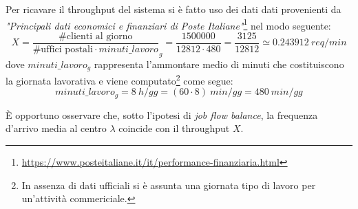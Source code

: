 Per ricavare il throughput del sistema si è fatto uso dei dati dati provenienti da \textsl{"Principali dati economici e finanziari di Poste Italiane"}\footnote{\url{https://www.posteitaliane.it/it/performance-finanziaria.html}} nel modo seguente:
\begin{equation}
X = \frac{\# \text{clienti al giorno}}{\#\text{uffici postali} \cdot minuti\_lavoro}_{g} = \frac{1500000}{12812\cdot 480} = \frac{3125}{12812} \simeq 0.243912\ req/min
\end{equation} 
dove $minuti\_lavoro_{g}$ rappresenta l'ammontare medio di minuti che costituiscono la giornata lavorativa e viene computato\footnote{In assenza di dati ufficiali si è assunta una giornata tipo di lavoro per un'attività commericiale.} come segue:
\begin{equation}
\label{eqn:modello-specifiche-15}
minuti\_lavoro_{g} = 8\ h/gg = (60 \cdot 8)\ min/gg = 480\ min/gg
\end{equation}

È opportuno osservare che, sotto l'ipotesi di \textsl{job flow balance}, la frequenza d'arrivo media al centro $\lambda$ coincide con il throughput $X$.

